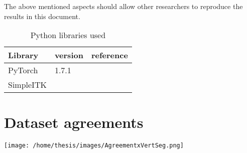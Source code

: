 The above mentioned aspects should allow other researchers to reproduce the results in this document.



\begin{SCtable}[\sidecaptionrelwidth][h]
 
  \begin{tabular}{ p{6cm} l l } 
   \hline
   \hline
   Library & version & reference  \\
   \hline 
   PyTorch & 1.7.1 &  \\ 
   SimpleITK &  &  \\ 
   \hline
   \hline
  \end{tabular}
  \caption{Python libraries used}

\end{SCtable}
\chapter{Dataset agreements\label{seg:datasetagreement}}

\texttt{[image: /home/thesis/images/AgreementxVertSeg.png]}